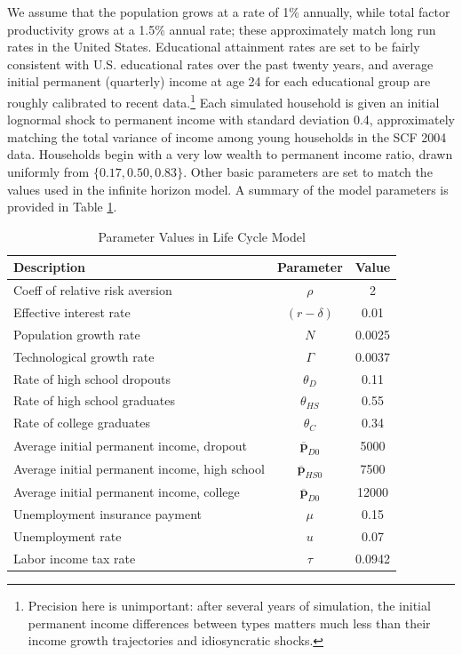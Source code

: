 \documentclass[11pt,a4paper,pdftex]{article}\usepackage[pdftex]{graphicx}\usepackage{epstopdf} \usepackage[pdftex]{hyperref}
\newcommand{\CRRA}{\ensuremath{\rho}}
\newcommand{\pLev}{\ensuremath{\pmb{p}}}
\newcommand{\rProd}{\ensuremath{\mathit{r}}}
\newcommand{\urate}{\ensuremath{u}}
\begin{document}
We assume that the population grows at a rate of 1\% annually, while total factor productivity grows at a 1.5\% annual rate; these approximately match long run rates in the United States.  Educational attainment rates are set to be fairly consistent with U.S. educational rates over the past twenty years, and average initial permanent (quarterly) income at age 24 for each educational group are roughly calibrated to recent data.\footnote{Precision here is unimportant: after several years of simulation, the initial permanent income differences between types matters much less than their income growth trajectories and idiosyncratic shocks.}  Each simulated household is given an initial lognormal shock to permanent income with standard deviation 0.4, approximately matching the total variance of income among young households in the SCF 2004 data.  Households begin with a very low wealth to permanent income ratio, drawn uniformly from $\{0.17,0.50,0.83\}$.  Other basic parameters are set to match the values used in the infinite horizon model.  A summary of the model parameters is provided in Table \ref{table:ParametersLifeCycle}.

\begin{table}
\caption{Parameter Values in Life Cycle Model}
\label{table:ParametersLifeCycle}
\begin{center}
\begin{tabular}{l c c}
\toprule
Description & Parameter & Value \\
\midrule
Coeff of relative risk aversion & \CRRA & 2 \\
Effective interest rate & $(\rProd - \delta)$ & 0.01 \\
Population growth rate & $N$ & 0.0025 \\
Technological growth rate & $\Gamma$ & 0.0037 \\
Rate of high school dropouts & $\theta_D$ & 0.11 \\
Rate of high school graduates & $\theta_{HS}$ & 0.55 \\
Rate of college graduates & $\theta_C$ & 0.34 \\
Average initial permanent income, dropout & $\overline{\pLev}_{D0}$ & 5000 \\
Average initial permanent income, high school & $\overline{\pLev}_{HS0}$ & 7500 \\
Average initial permanent income, college & $\overline{\pLev}_{D0}$ & 12000 \\
Unemployment insurance payment & $\mu$ & 0.15 \\
Unemployment rate & $\urate$ & 0.07 \\
Labor income tax rate & $\tau$ & 0.0942 \\
\bottomrule
\end{tabular}
\end{center}
\end{table}
\end{document}
